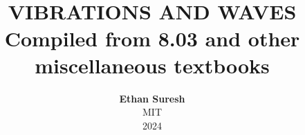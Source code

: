 \documentclass[openany,oneside]{book}
\begin{document}
\title{ \normalsize \textsc{}
		\\ [2.0cm]
		\HRule{1.5pt} \\
		\LARGE \textbf{\uppercase{Vibrations and Waves}
		\HRule{2.0pt} \\ [0.6cm] \LARGE{Compiled from 8.03 and other miscellaneous textbooks} \vspace*{10\baselineskip}}
		}
\date{}
\author{\textbf{Ethan Suresh} \\
		MIT \\
		2024}

\maketitle
\newpage

\tableofcontents
\newpage









\end{document}
